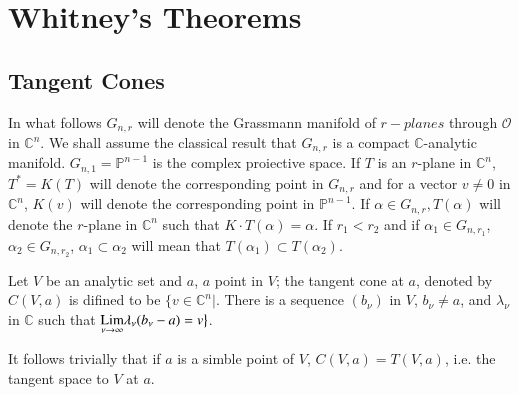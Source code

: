 \chapter{Whitney's Theorems}\label{chap3}
 
\section{Tangent Cones}\label{chap3-sec1}\pageoriginale

In what follows $G_{n,r}$ will denote the Grassmann manifold of
$r-planes$ through $\mathscr{O}$ in $ \mathbb{C}^n$. We shall assume
the classical result that $G_{n,r}$ is a compact $
\mathbb{C}$-analytic manifold. $G_{n,1}= \mathbb{P}^{n-1}$ is the
complex proiective space. If $T$ is an $r$-plane in $\mathbb{C}^n$,
$T^{*} = K(T)$ will denote the corresponding point in $G_{n,r}$ and for
a vector $v \neq 0$ in $ \mathbb{C}^n$, $K(v)$ will denote the
corresponding point in $\mathbb{P}^{n-1}$. If $\alpha \in G_{n,r},
T(\alpha)$ will denote the $r$-plane in $ \mathbb{C}^n$ such that
$K\cdot T(\alpha) = \alpha$. If $r_{1}< r_{2}$ and if $\alpha_{1}\in
G_{n,r_{1}}$, $\alpha_{2}\in G_{n, r_2}$, $\alpha_{1} \subset \alpha_{2}$
will mean that $T(\alpha_{1}) \subset T(\alpha_{2})$. 

\setcounter{definition}{0}
\begin{definition}\label{chap3-defin1} %
  Let $V$ be an analytic set and $a$, $a$ point in $V$; the tangent
  cone at $a$, denoted by $C(V,a)$ is difined to be $\big\{v \in
  \mathbb{C}^n |$. There is a sequence $(b_\nu)$ in $V$,
  $b_{\nu}\neq a$, and $\lambda_{\nu}$ in  $\mathbb{C}$ 
    such that $\underset{\nu \to
      \infty}{\text{\rm Lim}}\lambda_{\nu}(b_{\nu} -a) = v\big\}$.  
\end{definition}

\setcounter{remark}{0}
\begin{remark}\label{chap3-rem1} %
  It follows trivially that if $a$ is a simble point of $V$, $C(V,a)
  = T (V,a)$, i.e. the tangent space to $V$ at $a$. 
\end{remark}

